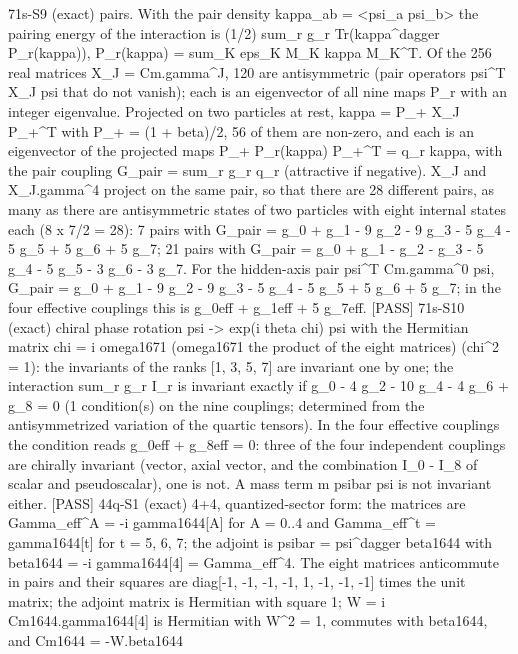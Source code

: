 \documentclass[
  10pt,
]{article}
\newenvironment{Shaded}{}{}
\newcommand{\NormalTok}[1]{#1}
\begin{document}
\begin{Shaded}
\begin{Highlighting}[]
\NormalTok{[PASS] 71s{-}S9  (exact) pairs. With the pair density kappa\_ab = \textless{}psi\_a psi\_b\textgreater{} the pairing energy of the interaction is (1/2) sum\_r g\_r Tr(kappa\^{}dagger P\_r(kappa)), P\_r(kappa) = sum\_K eps\_K M\_K kappa M\_K\^{}T. Of the 256 real matrices X\_J = Cm.gamma\^{}J, 120 are antisymmetric (pair operators psi\^{}T X\_J psi that do not vanish); each is an eigenvector of all nine maps P\_r with an integer eigenvalue. Projected on two particles at rest, kappa = P\_+ X\_J P\_+\^{}T with P\_+ = (1 + beta)/2, 56 of them are non{-}zero, and each is an eigenvector of the projected maps P\_+ P\_r(kappa) P\_+\^{}T = q\_r kappa, with the pair coupling G\_pair = sum\_r g\_r q\_r (attractive if negative). X\_J and X\_J.gamma\^{}4 project on the same pair, so that there are 28 different pairs, as many as there are antisymmetric states of two particles with eight internal states each (8 x 7/2 = 28): 7 pairs with G\_pair = g\_0 + g\_1 {-} 9 g\_2 {-} 9 g\_3 {-} 5 g\_4 {-} 5 g\_5 + 5 g\_6 + 5 g\_7; 21 pairs with G\_pair = g\_0 + g\_1 {-} g\_2 {-} g\_3 {-} 5 g\_4 {-} 5 g\_5 {-} 3 g\_6 {-} 3 g\_7. For the hidden{-}axis pair psi\^{}T Cm.gamma\^{}0 psi, G\_pair = g\_0 + g\_1 {-} 9 g\_2 {-} 9 g\_3 {-} 5 g\_4 {-} 5 g\_5 + 5 g\_6 + 5 g\_7; in the four effective couplings this is g\_0eff + g\_1eff + 5 g\_7eff.}
\NormalTok{[PASS] 71s{-}S10  (exact) chiral phase rotation psi {-}\textgreater{} exp(i theta chi) psi with the Hermitian matrix chi = i omega1671 (omega1671 the product of the eight matrices) (chi\^{}2 = 1): the invariants of the ranks [1, 3, 5, 7] are invariant one by one; the interaction sum\_r g\_r I\_r is invariant exactly if g\_0 {-} 4 g\_2 {-} 10 g\_4 {-} 4 g\_6 + g\_8 = 0 (1 condition(s) on the nine couplings; determined from the antisymmetrized variation of the quartic tensors). In the four effective couplings the condition reads g\_0eff + g\_8eff = 0: three of the four independent couplings are chirally invariant (vector, axial vector, and the combination I\_0 {-} I\_8 of scalar and pseudoscalar), one is not. A mass term m psibar psi is not invariant either.}
\NormalTok{[PASS] 44q{-}S1  (exact) 4+4, quantized{-}sector form: the matrices are Gamma\_eff\^{}A = {-}i gamma1644[A] for A = 0..4 and Gamma\_eff\^{}t = gamma1644[t] for t = 5, 6, 7; the adjoint is psibar = psi\^{}dagger beta1644 with beta1644 = {-}i gamma1644[4] = Gamma\_eff\^{}4. The eight matrices anticommute in pairs and their squares are diag[{-}1, {-}1, {-}1, {-}1, 1, {-}1, {-}1, {-}1] times the unit matrix; the adjoint matrix is Hermitian with square 1; W = i Cm1644.gamma1644[4] is Hermitian with W\^{}2 = 1, commutes with beta1644, and Cm1644 = {-}W.beta1644}

\end{Highlighting}
\end{Shaded}
\end{document}
